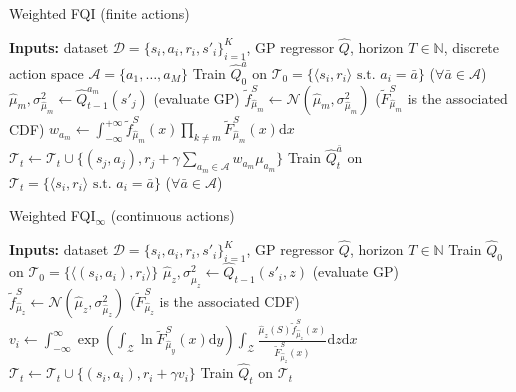 \begin{algorithm}[t]
\caption{Weighted FQI (finite actions)}
\label{A:WFQI}
\begin{small}
\begin{algorithmic} 
\STATE \textbf{Inputs:} dataset $\mathcal{D}=\{s_i,a_i,r_i,s'_i\}_{i=1}^{K}$, GP regressor $\widehat{Q}$, horizon $T \in \mathbb{N}$, discrete action space $\mathcal{A} = \{a_1,\ldots, a_M\}$
\STATE Train $\widehat{Q}_0^{\bar a}$ on $\mathcal{T}_0 = \{\langle s_i, r_i\rangle  \text{ s.t. } a_i = \bar{a} \}$ ($\forall \bar{a} \in \mathcal{A}$)
\STATE $\hat{\mu}_{m}, \sigma^2_{\hat{\mu}_{m}} \leftarrow \widehat{Q}_{t-1}^{a_m}(s'_j)$ (evaluate GP)
\STATE $\tilde{f}_{\hat{\mu}_{m}}^S \leftarrow \mathcal{N}(\hat{\mu}_{m}, \sigma^2_{\hat{\mu}_m})$ ($\tilde{F}_{\hat{\mu}_{m}}^S$ is the associated CDF) 
\STATE $w_{a_m} \leftarrow \int_{-\infty}^{+\infty} \tilde{f}_{\hat{\mu}_{m}}^S(x) \prod_{k\neq m} \tilde{F}^S_{\hat{\mu}_{m}}(x) \mathrm{d}x$
\ENDFOR
\STATE $\mathcal{T}_t \leftarrow \mathcal{T}_t \cup \{(s_j,a_j), r_j + \gamma \sum_{a_m \in \mathcal{A}} w_{a_m} \mu_{a_m}\}$
\ENDFOR
\STATE Train $\widehat{Q}_t^{\bar a}$ on $\mathcal{T}_t = \{\langle s_i, r_i\rangle  \text{ s.t. } a_i = \bar{a} \}$ ($\forall \bar{a} \in \mathcal{A}$)
\ENDFOR
\end{algorithmic}
\end{small}
\end{algorithm}

\begin{algorithm}[t]
\caption{Weighted FQI$_{\infty}$ (continuous actions)}
\label{A:continuousWFQI}
\begin{small}
\begin{algorithmic} 
\STATE \textbf{Inputs:} dataset $\mathcal{D}=\{s_i,a_i,r_i,s'_i\}_{i=1}^{K}$, GP regressor $\widehat{Q}$, horizon $T \in \mathbb{N}$
\STATE Train $\widehat{Q}_0$ on $\mathcal{T}_0 = \{\langle (s_i, a_i), r_i\rangle \}$
\STATE $\hat{\mu}_{z}, \sigma^2_{\hat{\mu}_{z}} \leftarrow \widehat{Q}_{t-1}(s'_i, z)$ (evaluate GP)
\STATE $\tilde{f}_{\hat{\mu}_z}^S \leftarrow \mathcal{N}(\hat{\mu}_{z}, \sigma^2_{\hat{\mu}_z})$ ($\tilde{F}_{\hat{\mu}_z}^S$ is the associated CDF) 
\STATE $v_i \leftarrow \int_{-\infty}^{\infty} \exp{\left( \int_{\mathcal{Z}} \ln \tilde{F}_{\hat{\mu}_y}^S(x)\mathrm{d}y \right)} \int_{\mathcal{Z}}  \frac{\hat{\mu}_z(S)  \tilde{f}_{\hat{\mu}_z}^S(x)}{\tilde{F}_{\hat{\mu}_z}^S(x)} \mathrm{d}z\mathrm{d}x$
\STATE $\mathcal{T}_t \leftarrow \mathcal{T}_t \cup \{(s_i,a_i), r_i + \gamma v_i\}$
\ENDFOR
\STATE Train $\widehat{Q}_t$ on $\mathcal{T}_t$
\ENDFOR
\end{algorithmic}
\end{small}
\end{algorithm}

